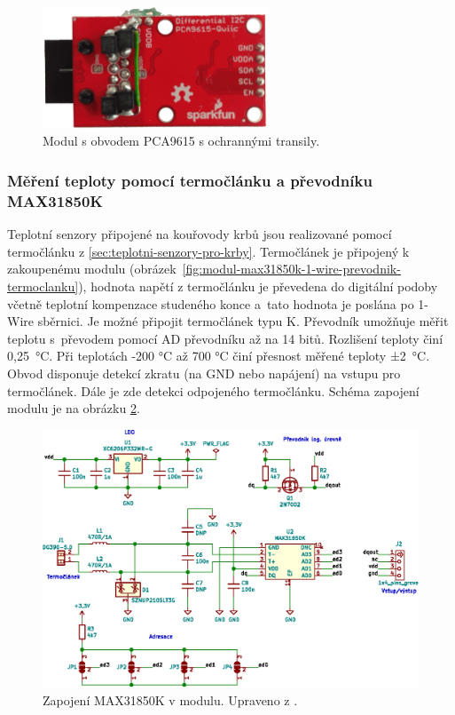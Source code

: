 \begin{figure}[H]
    \centering
    \includegraphics[width=0.6\textwidth]{images/krb/modul-pca9615-transily.png}
    \caption[Modul s obvodem PCA9615 s transily.]{Modul s obvodem PCA9615 s ochrannými transily.}
    \label{fig:modul-pca9615-transily}
\end{figure}


\subsubsection{Měření teploty pomocí termočlánku a převodníku MAX31850K}
Teplotní senzory připojené na kouřovody krbů jsou realizované pomocí termočlánku z \ref{sec:teplotni-senzory-pro-krby}. Termočlánek je připojený k zakoupenému modulu (obrázek~\ref{fig:modul-max31850k-1-wire-prevodnik-termoclanku}), hodnota napětí z termočlánku je převedena do digitální podoby včetně teplotní kompenzace studeného konce a~tato hodnota je poslána po 1-Wire sběrnici. Je možné připojit termočlánek typu K. Převodník umožňuje měřit teplotu s~převodem pomocí AD převodníku až na 14 bitů. Rozlišení teploty činí 0,25~°C. Při teplotách -200 °C až 700 °C činí přesnost měřené teploty ±2~°C. Obvod disponuje detekcí zkratu (na GND nebo napájení) na vstupu pro termočlánek. Dále je zde detekci odpojeného termočlánku. Schéma zapojení modulu je na obrázku \ref{fig:zapojeni-max31850k-1-wire-prevodnik-termoclanku}.

\begin{figure}[H]
    \centering
    \includegraphics[width=\textwidth]{images/svg/kicad/zapojeni-max31850k-1-wire-prevodnik-termoclanku.eps}
    \caption[Zapojení MAX31850K v modulu.]{Zapojení MAX31850K v modulu. Upraveno z \cite{prevodnik-max31850k}.}
    \label{fig:zapojeni-max31850k-1-wire-prevodnik-termoclanku}
\end{figure}


